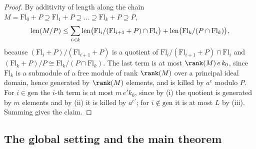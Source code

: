 \begin{proof}
By additivity of length along the chain $M=\mathrm{Fl}_0+P\supseteq\mathrm{Fl}_1+P\supseteq\dots\supseteq
\mathrm{Fl}_k+P\supseteq P$,
\[
\operatorname{len}(M/P)\le\sum_{i<k}\operatorname{len}\bigl(\mathrm{Fl}_i/(\mathrm{Fl}_{i+1}+P)\cap\mathrm{Fl}_i\bigr)
+\operatorname{len}\bigl(\mathrm{Fl}_k/(P\cap\mathrm{Fl}_k)\bigr),
\]
because $(\mathrm{Fl}_i+P)/(\mathrm{Fl}_{i+1}+P)$ is a quotient of $\mathrm{Fl}_i/(\mathrm{Fl}_{i+1}+P)\cap
\mathrm{Fl}_i$ and $(\mathrm{Fl}_k+P)/P\cong\mathrm{Fl}_k/(P\cap\mathrm{Fl}_k)$. The last term is at most
$\rank(M)\,e\,k_0$, since $\mathrm{Fl}_k$ is a submodule of a free module of rank $\rank(M)$ over a principal ideal
domain, hence generated by $\rank(M)$ elements, and is killed by $a^e$ modulo $P$. For $i\in\mathrm{gen}$ the $i$-th
term is at most $m\,e'k_0$, since by (i) the quotient is generated by $m$ elements and by (ii) it is killed by $a^{e'}$;
for $i\notin\mathrm{gen}$ it is at most $L$ by (iii). Summing gives the claim.
\end{proof}

\subsection{The global setting and the main theorem}\label{pf:linkN-adm:global}

